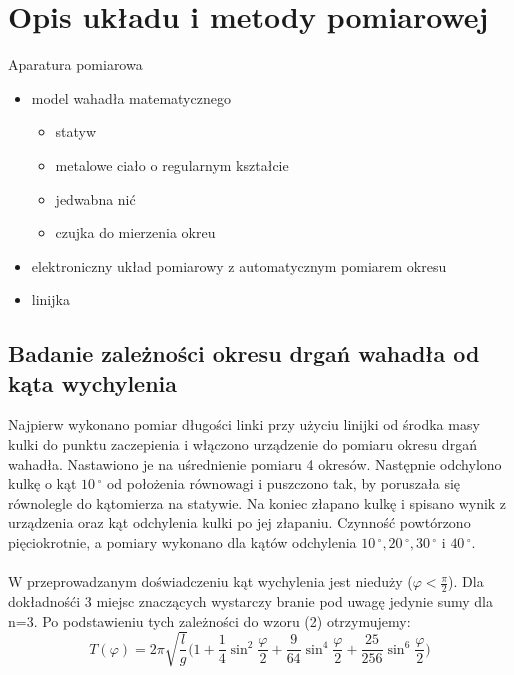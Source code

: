 \documentclass[a4paper,10pt]{article}
\begin{document}
\section{Opis układu i metody pomiarowej}
Aparatura pomiarowa
\begin{itemize}
  \item model wahadła matematycznego
\begin{itemize}
  \item statyw
  \item metalowe ciało o regularnym kształcie
  \item jedwabna nić
  \item czujka do mierzenia okreu
\end{itemize}
  \item elektroniczny układ pomiarowy z automatycznym pomiarem okresu
  \item linijka
\end{itemize}
 
\subsection{Badanie zależności okresu drgań wahadła od kąta wychylenia}
Najpierw wykonano pomiar długości linki przy użyciu linijki od środka masy kulki do punktu zaczepienia  i włączono urządzenie do pomiaru okresu drgań wahadła. Nastawiono je na uśrednienie pomiaru 4 okresów. Następnie odchylono kulkę o kąt $10\,^{\circ}$ od położenia równowagi i puszczono tak, by poruszała się równolegle do kątomierza na statywie. Na koniec złapano kulkę i spisano wynik z urządzenia oraz kąt odchylenia kulki po jej złapaniu. Czynność powtórzono pięciokrotnie, a pomiary wykonano dla kątów odchylenia  $10\,^{\circ}, 20\,^{\circ}, 30\,^{\circ}$ i $40\,^{\circ}$.
\\
\\W przeprowadzanym doświadczeniu kąt wychylenia jest nieduży ($\varphi<\frac{\pi}{2}$). Dla dokładnośći 3 miejsc znaczących wystarczy branie pod uwagę jedynie sumy dla n=3. Po podstawieniu tych zależności do wzoru (2) otrzymujemy:
\begin{equation}
T(\varphi) = 2\pi\sqrt{\frac{l}{g}}\bigg(1+\frac{1}{4}\sin^2\frac{\varphi}{2}+\frac{9}{64}\sin^4\frac{\varphi}{2}+\frac{25}{256}\sin^6\frac{\varphi}{2}\bigg)
\end{equation}
\end{document}
